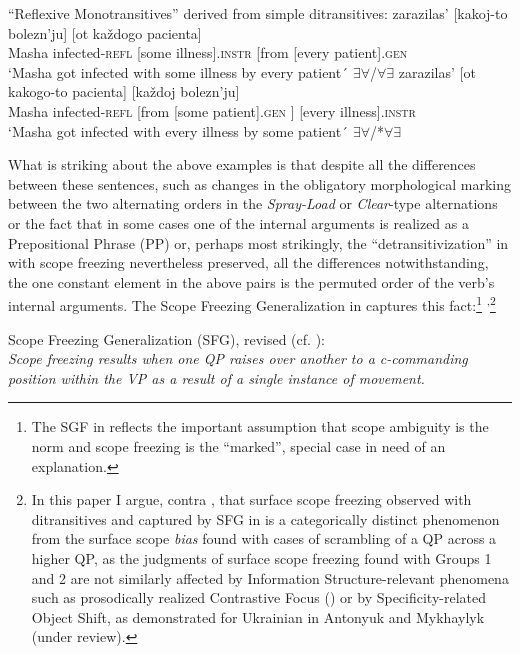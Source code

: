 \documentclass[output=paper,colorlinks,citecolor=brown]{./langscibook}
\begin{document}
\ea%
    \label{ex:antonyuk:7}
    “Reflexive Monotransitives” derived from simple ditransitives:
    \ea \label{ex:antonyuk:7a}
       {zarazilas’}         {[kakoj-to} {bolezn’ju]} {[ot}      {každogo} {pacienta]}\\
    Masha infected-\textsc{refl}  [some illness].\textsc{instr} [from [every     patient].\textsc{gen}\\
    \glt `Masha got infected with some illness by every patient´ \hfill ${\exists}{\forall}$/${\forall}{\exists}$
    \ex \label{ex:antonyuk:7b}
       {zarazilas’}          {[ot}      {kakogo-to} {pacienta]}      {} {[každoj} bolezn’ju]\\
    Masha infected-\textsc{refl}   [from [some         patient].\textsc{gen} ] [every illness].\textsc{instr}\\
    \glt `Masha got infected with every illness by some patient´ \hfill ${\exists}{\forall}$/*${\forall}{\exists}$
    \z
\z

What is striking about the above examples is that despite all the differences between these sentences, such as changes in the obligatory morphological marking between the two alternating orders in the \textit{Spray-Load} or \textit{Clear}{}-type alternations or the fact that in some cases one of the internal arguments is realized as a Prepositional Phrase (PP) or, perhaps most strikingly, the “detransitivization” in  with scope freezing nevertheless preserved, all the differences notwithstanding, the one constant element in the above pairs is the permuted order of the verb’s internal arguments. The Scope Freezing Generalization in  captures this fact:\footnote{The SGF in  reflects the important assumption that scope ambiguity is the norm and scope freezing is the “marked”, special case in need of an explanation.} \textsuperscript{,}\footnote{In this paper I argue, contra \citet{Antonyuk2015}, that surface scope freezing observed with ditransitives and captured by SFG in  is a categorically distinct phenomenon from the surface scope \textit{bias} found with cases of scrambling of a QP across a higher QP, as the judgments of surface scope freezing found with Groups 1 and 2 are not similarly affected by Information Structure-relevant phenomena such as prosodically realized Contrastive Focus (\citealt{AntonyukLarson2016}) or by Specificity-related Object Shift, as demonstrated for Ukrainian in Antonyuk and Mykhaylyk (under review).}

\ea%
    \label{ex:antonyuk:8}
    Scope Freezing Generalization (SFG), revised (cf. \citealt{Antonyuk2015}):\\
    \textit{Scope freezing results when one QP raises over another to a c-commanding position within the VP as a result of a single instance of movement.}
    \z
\end{document}
